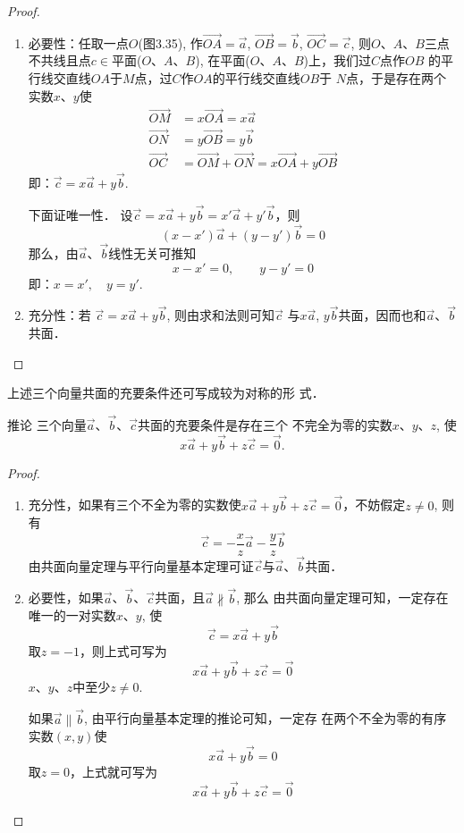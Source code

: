 \begin{proof}
\begin{enumerate}
    \item 必要性：任取一点$O$(图3.35), 作$\Vec{OA}=\vec{a}$, 
    $\Vec{OB}=\vec{b}$, $\Vec{OC}=\vec{c}$, 则$O$、$A$、$B$三点不共线且点$c\in $平面($O$、$A$、$B$), 在平面($O$、$A$、$B$)上，我们过$C$点作$OB$
    的平行线交直线$OA$于$M$点，过$C$作$OA$的平行线交直线$OB$于
    $N$点，于是存在两个实数$x$、$y$使
\[\begin{split}
     \Vec{OM}&=x\Vec{OA}=x\vec{a}\\
     \Vec{ON}&=y\Vec{OB}=y\vec{b}\\
     \Vec{OC}&=\Vec{OM}+\Vec{ON}=x\Vec{OA}+y\Vec{OB}
\end{split}\]
即：$\vec{c}=x\vec{a}+y\vec{b}$.

下面证唯一性．
设$\vec{c}=x\vec{a}+y\vec{b}=x'\vec{a}+y'\vec{b}$，则\
\[(x-x')\vec{a}+(y-y')\vec{b}=0\]
那么，由$\vec{a}$、$\vec{b}$线性无关可推知
\[x-x'=0,\qquad y-y'=0\]
即：$x=x',\quad y=y'$.

\item 充分性：若
$\vec{c}=x\vec{a}+y\vec{b}$, 则由求和法则可知$\vec{c}$
与$x\vec{a}$, $y\vec{b}$共面，因而也和$\vec{a}$、$\vec{b}$共面．
\end{enumerate}
\end{proof}

上述三个向量共面的充要条件还可写成较为对称的形
式．

\begin{blk}
    {推论} 三个向量$\vec{a}$、$\vec{b}$、$\vec{c}$共面的充要条件是存在三个
不完全为零的实数$x$、$y$、$z$, 使
\[x\vec{a}+y\vec{b}+z\vec{c}=\vec{0}.\]
\end{blk}

\begin{proof}
\begin{enumerate}
    \item 充分性，如果有三个不全为零的实数使$x\vec{a}+y\vec{b}+z\vec{c}=\vec{0}$，不妨假定$z\ne 0$, 则有
\[\vec{c}=-\frac{x}{z}\vec{a}-\frac{y}{z}\vec{b}\]
    由共面向量定理与平行向量基本定理可证$\vec{c}$与$\vec{a}$、$\vec{b}$共面．

\item 必要性，如果$\vec{a}$、$\vec{b}$、$\vec{c}$共面，且$\vec{a}\nparallel \vec{b}$, 那么
由共面向量定理可知，一定存在唯一的一对实数$x$、$y$, 使
\[\vec{c}=x\vec{a}+y\vec{b}\]
取$z=-1$，则上式可写为
\[x\vec{a}+y\vec{b}+z\vec{c}=\vec{0}\]
$x$、$y$、$z$中至少$z\ne 0$.

如果$\vec{a}\parallel \vec{b}$, 由平行向量基本定理的推论可知，一定存
在两个不全为零的有序实数$(x,y)$使
\[x\vec{a}+y\vec{b}=0\]
取$z=0$，上式就可写为
\[x\vec{a}+y\vec{b}+z\vec{c}=\vec{0}\]
\end{enumerate}
\end{proof}    

